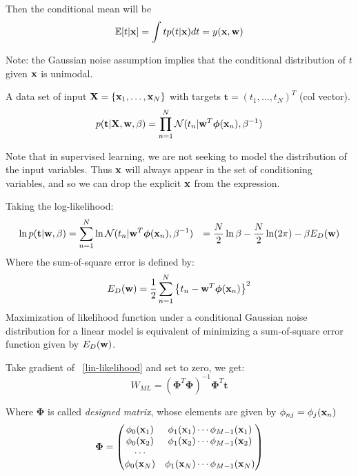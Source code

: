 Then the conditional mean will be 
\begin{equation}
    \mathbb{E}[t|\mathbf{x}] = \int t p(t|\mathbf{x}) dt = y(\mathbf{x}, \mathbf{w})
\end{equation}

Note: the Gaussian noise assumption implies that the conditional
distribution of $t$ given $\mathbf{x}$ is unimodal.

A data set of input $\mathbf{X} = \left\{ \mathbf{x}_1, \dots, \mathbf{x}_N \right\}$
with targets $\mathbf{t}=(t_1, \dots, t_N)^T$ (col vector). 
\begin{equation}
    p(\mathbf{t}|\mathbf{X}, \mathbf{w}, \beta)= \prod_{n=1}^N \mathcal{N}(t_n|\mathbf{w}^T
    \boldsymbol\phi(\mathbf{x}_n), \beta^{-1})
\end{equation}

Note that in supervised learning, we are not seeking to model the
distribution of the input variables. Thus $\mathbf{x}$ will always appear in the
set of conditioning variables, and so we can drop the explicit $\mathbf{x}$ from
the expression.

Taking the log-likelihood:
\begin{align}
    \ln p(\mathbf{t}| \mathbf{w}, \beta) &= \sum_{n=1}^N \ln
    \mathcal{N}(t_n|\mathbf{w}^T\boldsymbol\phi(\mathbf{x}_n), \beta^{-1})
    &=\frac{N}{2} \ln \beta - \frac{N}{2}\ln(2\pi) - \beta E_D(\mathbf{w})
    \label{lin-likelihood}
\end{align}
Where the sum-of-square error is defined by:
\begin{equation}
    E_D(\mathbf{w}) = \frac{1}{2}\sum_{n=1}^N \left\{ t_n - \mathbf{w}^T
    \boldsymbol\phi(\mathbf{x}_n) \right\}^2
\end{equation}
Maximization of likelihood function under a conditional Gaussian noise
distribution for a linear model is equivalent of minimizing a
sum-of-square error function given by $E_D(\mathbf{w})$.

Take gradient of ~\ref{lin-likelihood} and set to zero, we get:
\begin{equation}
    W_{ML} = (\boldsymbol\Phi^T\boldsymbol\Phi)^{-1}\boldsymbol\Phi^T
    \mathbf{t}
\end{equation}

Where $\boldsymbol\Phi$ is called \emph{designed matrix}, whose elements are
given by $\phi_{nj} = \phi_j(\mathbf{x}_n)$
\begin{equation}
    \boldsymbol\Phi = \begin{pmatrix}
        \phi_0(\mathbf{x}_1) & \phi_1(\mathbf{x}_1) \cdots \phi_{M-1}(\mathbf{x}_1) \\
        \phi_0(\mathbf{x}_2) & \phi_1(\mathbf{x}_2) \cdots \phi_{M-1}(\mathbf{x}_2)\\
        \cdots \\
        \phi_0(\mathbf{x}_N) & \phi_1(\mathbf{x}_N) \cdots \phi_{M-1}(\mathbf{x}_N) 
    \end{pmatrix}
\end{equation}

